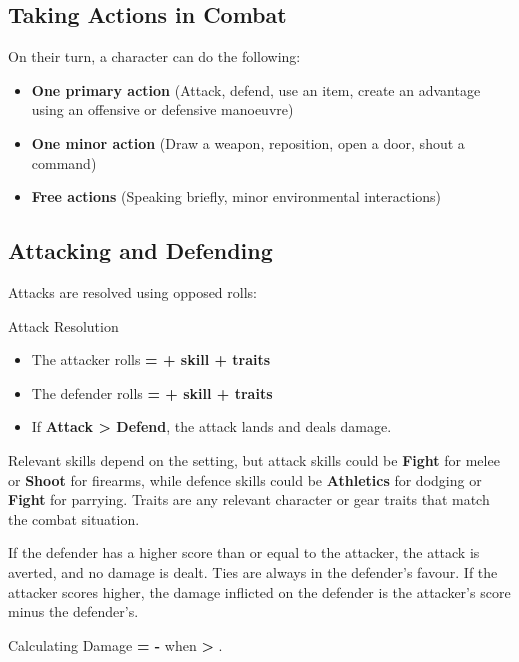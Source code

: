 \begin{multicols}{2}
\subsection{Taking Actions in Combat}

On their turn, a character can do the following:
\begin{itemize}
    \item \textbf{One primary action} (Attack, defend, use an item, create an advantage using an offensive or defensive manoeuvre)
    \item \textbf{One minor action} (Draw a weapon, reposition, open a door, shout a command)
    \item \textbf{Free actions} (Speaking briefly, minor environmental interactions)
\end{itemize}

\subsection{Attacking and Defending}

Attacks are resolved using opposed rolls:
\begin{Example}{Attack Resolution}
	\begin{itemize}
    	\item The attacker rolls \textbf{\Attack = \FudgeRoll + skill + traits}
	    \item The defender rolls \textbf{\Defend = \FudgeRoll + skill + traits} 	    
	    \item If \textbf{Attack > Defend}, the attack lands and deals damage.
	\end{itemize}
\end{Example}

Relevant skills depend on the setting, but attack skills could be \textbf{Fight} for melee or \textbf{Shoot} for firearms, while defence skills could be \textbf{Athletics} for dodging or \textbf{Fight} for parrying. Traits are any relevant character or gear traits that match the combat situation.

If the defender has a higher score than or equal to the attacker, the attack is averted, and no damage is dealt. Ties are always in the defender's favour. If the attacker scores higher, the damage inflicted on the defender is the attacker's score minus the defender's.

\begin{Example}{Calculating Damage}
    \textbf{\Damage = \Attack - \Defend} when \textbf{\Attack > \Defend}.
\end{Example}


\end{multicols}
